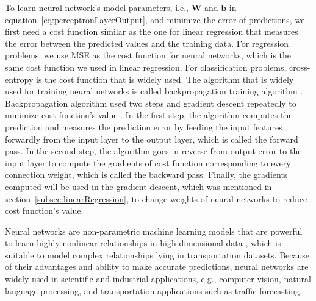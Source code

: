 \documentclass[english]{kththesis}
\begin{document}
To learn neural network's model parameters, i.e., $\mathbf{W}$ and $\mathbf{b}$ in equation~\ref{eq:perceptronLayerOutput}, and minimize the error of predictions, we first need a cost function similar as the one for linear regression that measures the error between the predicted values and the training data. For regression problems, we use MSE as the cost function for neural networks, which is the same cost function we used in linear regression. For classification problems, cross-entropy is the cost function that is widely used. The algorithm that is widely used for training neural networks is called backpropagation training algorithm \cite{rumelhart_back_propagation}. Backpropagation algorithm used two steps and gradient descent repeatedly to minimize cost function's value \cite{geron_handson_ml}. In the first step, the algorithm computes the prediction and measures the prediction error by feeding the input features forwardly from the input layer to the output layer, which is called the forward pass. In the second step, the algorithm goes in reverse from output error to the input layer to compute the gradients of cost function corresponding to every connection weight, which is called the backward pass. Finally, the gradients computed will be used in the gradient descent, which was mentioned in section~\ref{subsec:linearRegression}, to change weights of neural networks to reduce cost function's value.

Neural networks are non-parametric machine learning models that are powerful to learn highly nonlinear relationships in high-dimensional data \cite{vlahogianni_forecast_overview, ma_lstm_predict}, which is suitable to model complex relationships lying in transportation datasets. Because of their advantages and ability to make accurate predictions, neural networks are widely used in scientific and industrial applications, e.g., computer vision, natural language processing, and transportation applications such as traffic forecasting.
\end{document}

